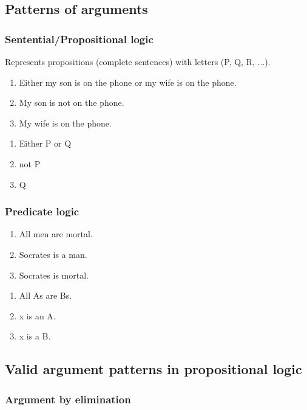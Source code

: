 \subsection{Patterns of arguments}

\subsubsection{Sentential/Propositional logic}

Represents propositions (complete sentences) with letters (P, Q, R, ...).

\begin{enumerate}
    \item Either my son is on the phone or my wife is on the phone.
    \item My son is not on the phone.
    \item My wife is on the phone.
\end{enumerate}

\begin{enumerate}
    \item Either P or Q
    \item not P
    \item Q
\end{enumerate}

\subsubsection{Predicate logic}

\begin{enumerate}
    \item All men are mortal.
    \item Socrates is a man.
    \item Socrates is mortal.
\end{enumerate}

\begin{enumerate}
    \item All As are Bs.
    \item x is an A.
    \item x is a B.
\end{enumerate}

\subsection{Valid argument patterns in propositional logic}

\subsubsection{Argument by elimination}

